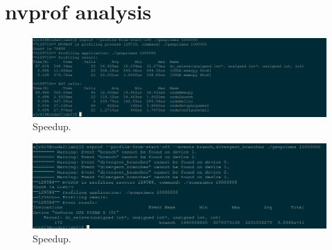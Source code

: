 \documentclass{article}
\begin{document}
\section{nvprof analysis}
\begin{figure}[ht!]
  \centering
  \includegraphics[width=1\textwidth]{nvprof}
  \caption{Speedup.\label{fig:speedup}}
\end{figure}

\begin{figure}[ht!]
  \centering
  \includegraphics[width=1\textwidth]{branch_divergence}
  \caption{Speedup.\label{fig:speedup}}
\end{figure}
\end{document}
